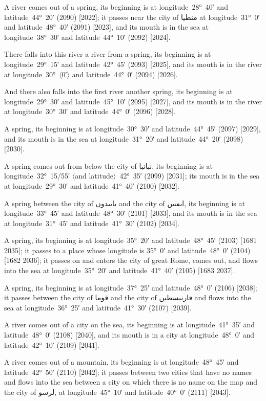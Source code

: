 \documentclass[11pt]{article}
\newcommand{\Pg}[1]{\marginpar{\footnotesize #1}}
\newcommand{\Ang}[1]{\ensuremath{#1}}
\begin{document}
A river comes out of a spring, its beginning is at longitude~28°~40′ and latitude~44°~20′ (2090) [2022]\Pg{p. 138}; it passes near the city of \textarabic{منطيا} at longitude~31°~0′ and latitude~48°~40′ (2091) [2023], and its mouth is in the sea at longitude~38°~30′ and latitude~44°~10′ (2092) [2024].

There falls into this river a river from a spring, its beginning is at longitude~29°~15′ and latitude~42°~45′ (2093) [2025], and its mouth is in the river at longitude~30°~\Ang{\langle}0′\Ang{\rangle} and latitude~44°~0′ (2094) [2026].

And there also falls into the first river another spring, its beginning is at longitude~29°~30′ and latitude~45°~10′ (2095) [2027], and its mouth is in the river at longitude~30°~30′ and latitude~44°~0′ (2096) [2028].

A spring, its beginning is at longitude~30°~30′ and latitude~44°~45′ (2097) [2029], and its mouth is in the sea at longitude~31°~20′ and latitude~44°~20′ (2098) [2030].

A spring comes out from below the city of \textarabic{نبانبا}, its beginning is at longitude~32°~15/55′ \Ang{\langle}and latitude\Ang{\rangle}~42°~35′ (2099) [2031]; its mouth is in the sea at longitude~29°~30′ and latitude~41°~40′ (2100) [2032].

A spring between the city of \textarabic{ٮاٮٮدوں} and the city of \textarabic{اٮڡس}, its beginning is at longitude~33°~45′ and latitude~48°~30′ (2101) [2033], and its mouth is in the sea at longitude~31°~45′ and latitude~41°~30′ (2102) [2034].

A spring, its beginning is at longitude~35°~20′ and latitude~48°~45′ (2103) [1681 2035]; it passes to a place whose longitude is 35°~0′ and latitude~48°~0′ (2104) [1682 2036]; it passes on and enters the city of great Rome, comes out, and flows into the sea at longitude~35°~20′ and latitude~41°~40′ (2105) [1683 2037].

A spring, its beginning is at longitude~37°~25′ and latitude~48°~0′ (2106) [2038]; it passes between the city of \textarabic{قوما} and the city of \textarabic{ڡارنبسطين} and flows into the sea at longitude~36°~25′ and latitude~41°~30′ (2107) [2039]\Pg{p. 139}.

A river comes out of a city on the sea, its beginning is at longitude~41°~35′ and latitude~48°~0′ (2108) [2040], and its mouth is in a city at longitude~48°~0′ and latitude~42°~10′ (2109) [2041].

A river comes out of a mountain, its beginning is at longitude~48°~45′ and latitude~42°~50′ (2110) [2042]; it passes between two cities that have no names and flows into the sea between a city on which there is no name on the map and the city of \textarabic{لرسو}, at longitude~45°~10′ and latitude~40°~0′ (2111) [2043].
\end{document}
